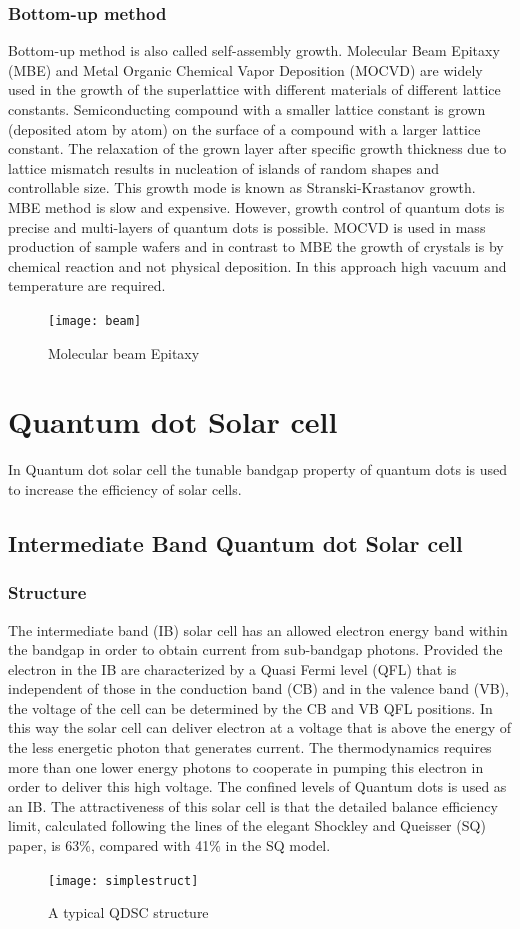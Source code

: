\documentclass[hidelinks, 12pt]{report}
\begin{document}
\subsection*{Bottom-up method}
Bottom-up method is also called self-assembly growth. Molecular Beam Epitaxy (MBE) and Metal Organic Chemical Vapor Deposition (MOCVD) are widely used in the growth of the superlattice with different materials of different lattice constants. Semiconducting compound with a smaller lattice constant is grown (deposited atom by atom) on the surface of a compound with a larger lattice constant. The relaxation of the grown layer after specific growth thickness due to lattice mismatch results in nucleation of islands of random shapes and controllable size. This growth mode is known as Stranski-Krastanov growth. MBE method is slow and expensive. However, growth control of quantum dots is precise and multi-layers of quantum dots is possible. MOCVD is used in mass production of sample wafers and in contrast to MBE the growth of crystals is by chemical reaction and not physical deposition. In this approach high vacuum and temperature are required.
\begin{figure}[H]
\centering
\texttt{[image: beam]}
\caption[Molecular beam Epitaxy]{Molecular beam Epitaxy \cite{syn}}
\label{Molecular beam Epitaxy}
\end{figure}

\chapter{Quantum dot Solar cell}
In Quantum dot solar cell the tunable bandgap property of quantum dots is used to increase the efficiency of solar cells.
\section{Intermediate Band Quantum dot Solar cell}
\subsection{Structure}
The intermediate band (IB) solar cell has an allowed electron energy band within the bandgap in order to obtain current from sub-bandgap photons. Provided the electron in the IB are characterized by a Quasi Fermi level (QFL) that is independent of those in the conduction band (CB) and in the valence band (VB), the voltage of the cell can be determined by the CB and VB QFL positions. In this way the solar cell can deliver electron at a voltage  that is above the energy of the less energetic photon that generates current. The thermodynamics requires more than one lower energy photons to cooperate in pumping this electron in order to deliver this high voltage. The confined levels of Quantum dots is used as an IB. The attractiveness of this solar cell is that the detailed balance efficiency limit, calculated following the lines of the elegant Shockley and Queisser (SQ) paper, is 63\%, compared with 41\% in the SQ model. \cite{ib} \\
\begin{figure}[H]
\centering
\texttt{[image: simplestruct]}
\caption[A typical QDSC structure]{A typical QDSC structure \cite{pf}}
\label{Quantum dots}
\end{figure} 
\end{document}
